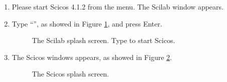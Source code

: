 \begin{enumerate}
\item
  Please start Scicos 4.1.2 from the  menu. The Scilab
  window appears.

\item
  Type ``'', as showed in Figure
  \ref{fig:scilab_splash}, and press Enter.
%
\begin{figure}[htb]
\caption{The Scilab splash screen. Type  to start Scicos.}
\label{fig:scilab_splash}
\end{figure}

\item
  The Scicos windows appears, as showed in Figure
  \ref{fig:scicos_splash}.
%
\begin{figure}[htb]
\caption{The Scicos splash screen.}
\label{fig:scicos_splash}
\end{figure}


\end{enumerate}
